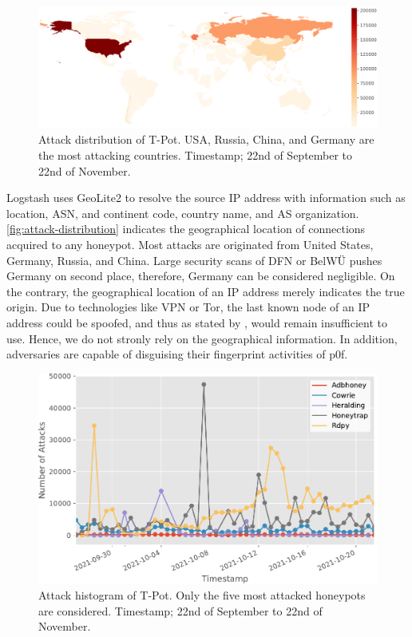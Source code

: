 \begin{figure}[ht]
    \centering
    \includegraphics[width=\textwidth]{figures/tpot-overview-map.pdf}
    \caption[Attack distribution of T-Pot]{Attack distribution of T-Pot. USA, Russia, China, and Germany are the most attacking countries. Timestamp; 22nd of September to 22nd of November.}
    \label{fig:attack-distribution}
\end{figure}

Logstash uses GeoLite2 to resolve the source IP address with information such as location, ASN, and continent code, country name, and AS organization.
\autoref{fig:attack-distribution} indicates the geographical location of connections acquired to any honeypot.
Most attacks are originated from United States, Germany, Russia, and China.
Large security scans of DFN or BelWÜ pushes Germany on second place, therefore, Germany can be considered negligible.
On the contrary, the geographical location of an IP address merely indicates the true origin. 
Due to technologies like VPN or Tor, the last known node of an IP address could be spoofed, and thus as stated by \citet{Kelly2021}, would remain insufficient to use.
Hence, we do not stronly rely on the geographical information.
In addition, adversaries are capable of disguising their fingerprint activities of p0f.

\begin{figure}[ht]
    \centering
    \includegraphics[width=\textwidth]{figures/tpot-attacks-histogram.pdf}
    \caption[Attack histogram of T-Pot]{Attack histogram of T-Pot. Only the five most attacked honeypots are considered. Timestamp; 22nd of September to 22nd of November.}
    \label{tpot-overview-histogram}
\end{figure}

